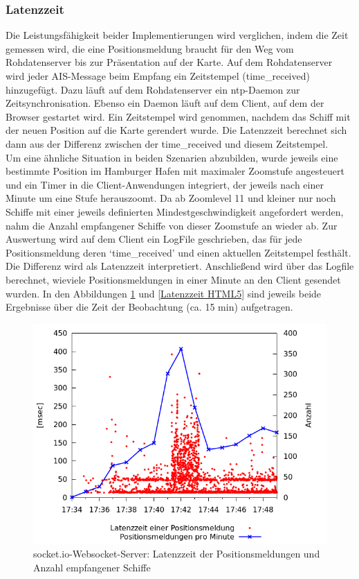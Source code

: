 \subsubsection{Latenzzeit}
Die Leistungsfähigkeit beider Implementierungen wird verglichen, indem die Zeit gemessen wird, die eine Positionsmeldung braucht für den Weg vom Rohdatenserver bis zur Präsentation auf der Karte.
Auf dem Rohdatenserver wird jeder AIS-Message beim Empfang ein Zeitstempel (time\_received) hinzugefügt. Dazu läuft auf dem Rohdatenserver ein ntp-Daemon zur Zeitsynchronisation. Ebenso ein Daemon läuft auf dem Client, auf dem der Browser gestartet wird. Ein Zeitstempel wird genommen, nachdem das Schiff mit der neuen Position auf die Karte gerendert wurde. Die Latenzzeit berechnet sich dann aus der Differenz zwischen der time\_received und diesem Zeitstempel. \\
Um eine ähnliche Situation in beiden Szenarien abzubilden, wurde jeweils eine bestimmte Position im Hamburger Hafen mit maximaler Zoomstufe angesteuert und ein Timer in die Client-Anwendungen integriert, der jeweils nach einer Minute um eine Stufe herauszoomt. Da ab Zoomlevel 11 und kleiner nur noch Schiffe mit einer jeweils definierten Mindestgeschwindigkeit angefordert werden, nahm die Anzahl empfangener Schiffe von dieser Zoomstufe an wieder ab. Zur Auswertung wird auf dem Client ein LogFile geschrieben, das für jede Positionsmeldung deren ‘time\_received’ und einen aktuellen Zeitstempel festhält. Die Differenz wird als Latenzzeit interpretiert. Anschließend wird über das Logfile berechnet, wieviele Positionsmeldungen in einer Minute an den Client gesendet wurden. In den Abbildungen \ref{Latenzzeit socket.io} und \ref{Latenzzeit HTML5} sind jeweils beide Ergebnisse über die Zeit der Beobachtung (ca. 15 min) aufgetragen.
\begin {figure}[H]
\begin{center}
  \includegraphics[width=4.5in]{images/latency_timeReceived_socket_io.png}
\end{center}
\caption{socket.io-Websocket-Server: Latenzzeit der Positionsmeldungen und Anzahl empfangener Schiffe}
\label {Latenzzeit socket.io}
\end {figure}

